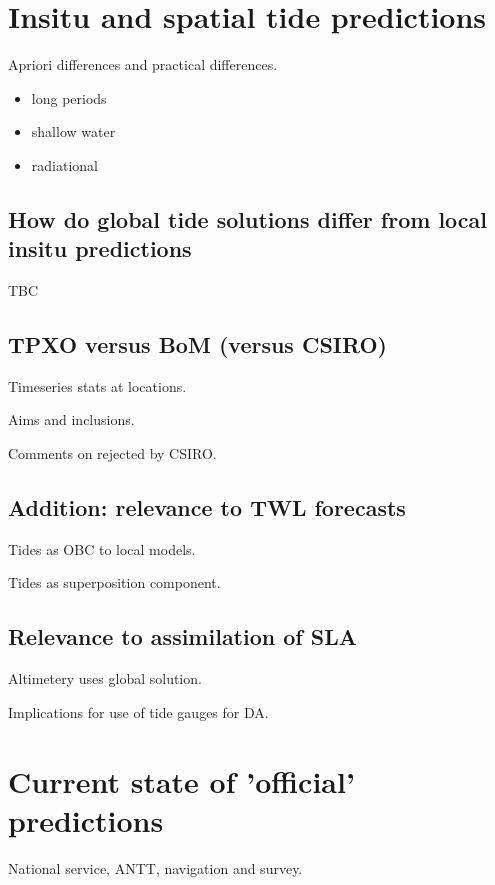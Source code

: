 
\section{Insitu and spatial tide predictions}

Apriori differences and practical differences.

\begin{itemize}
    \item long periods
    \item shallow water
    \item radiational
\end{itemize}

\subsection{How do global tide solutions differ from local insitu predictions}
TBC

\subsection{TPXO versus BoM (versus CSIRO)}
Timeseries stats at locations.

Aims and inclusions.

Comments on rejected by CSIRO.

\subsection{Addition: relevance to TWL forecasts}
Tides as OBC to local models.

Tides as superposition component.

\subsection{Relevance to assimilation of SLA}
Altimetery uses global solution.

Implications for use of tide gauges for DA.


\section{Current state of 'official' predictions}

National service, ANTT, navigation and survey.


